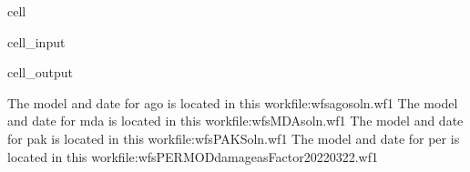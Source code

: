 \documentclass[letterpaper,10pt,english]{jupyterBook}
\begin{document}
\begin{sphinxuseclass}{cell}\begin{sphinxVerbatimInput}

\begin{sphinxuseclass}{cell_input}
\begin{sphinxVerbatim}[commandchars=\\\{\}]
  \PYG{p}{[}\PYG{p}{]}    
   
\end{sphinxVerbatim}

\end{sphinxuseclass}\end{sphinxVerbatimInput}
\begin{sphinxVerbatimOutput}

\begin{sphinxuseclass}{cell_output}
\begin{sphinxVerbatim}[commandchars=\\\{\}]
The model and date for ago is located in this workfile:wfs\PYGZbs{}agosoln.wf1
The model and date for mda is located in this workfile:wfs\PYGZbs{}MDAsoln.wf1
The model and date for pak is located in this workfile:wfs\PYGZbs{}PAKSoln.wf1
The model and date for per is located in this workfile:wfs\PYGZbs{}PERMOD\PYGZus{}damage\PYGZus{}asFactor20220322.wf1
\end{sphinxVerbatim}

\end{sphinxuseclass}\end{sphinxVerbatimOutput}

\end{sphinxuseclass}
\end{document}
